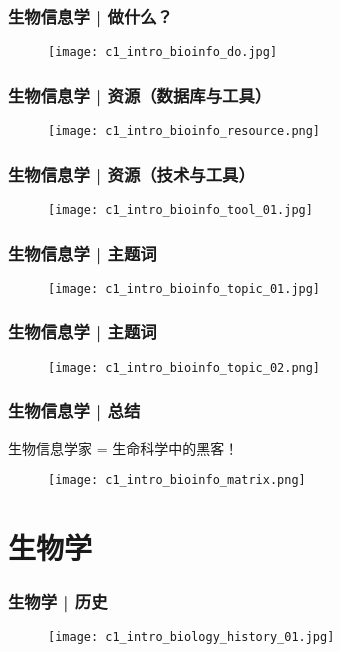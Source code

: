 \begin{frame}
  \frametitle{生物信息学 | \alert{做什么？}}
  \begin{figure}
    \centering
    \texttt{[image: c1\_intro\_bioinfo\_do.jpg]}
  \end{figure}
\end{frame}

\begin{frame}
  \frametitle{生物信息学 | 资源（数据库与工具）}
  \begin{figure}
    \centering
    \texttt{[image: c1\_intro\_bioinfo\_resource.png]}
  \end{figure}
\end{frame}

\begin{frame}
  \frametitle{生物信息学 | 资源（技术与工具）}
  \begin{figure}
    \centering
    \texttt{[image: c1\_intro\_bioinfo\_tool\_01.jpg]}
  \end{figure}
\end{frame}

\begin{frame}
  \frametitle{生物信息学 | 主题词}
  \begin{figure}
    \centering
    \texttt{[image: c1\_intro\_bioinfo\_topic\_01.jpg]}
  \end{figure}
\end{frame}

\begin{frame}
  \frametitle{生物信息学 | 主题词}
  \begin{figure}
    \centering
    \texttt{[image: c1\_intro\_bioinfo\_topic\_02.png]}
  \end{figure}
\end{frame}

\begin{frame}
  \frametitle{生物信息学 | 总结}
  \begin{center}
    {\Large 生物信息学家 = 生命科学中的黑客！}
  \end{center}
  \vspace{-1em}
  \begin{figure}
    \centering
    \texttt{[image: c1\_intro\_bioinfo\_matrix.png]}
  \end{figure}
\end{frame}

\section{生物学}
\begin{frame}
  \frametitle{生物学 | 历史}
  \begin{figure}
    \centering
    \texttt{[image: c1\_intro\_biology\_history\_01.jpg]}
  \end{figure}
\end{frame}

